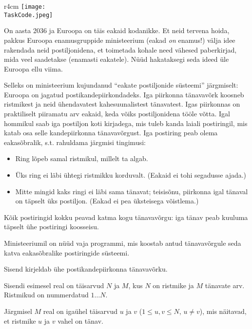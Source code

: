 ﻿\documentclass{boi2014-et}
\renewcommand{\TaskCode}{postmen}
\begin{document}
    \begin{wrapfigure}[8]{r}{4cm}
        \vspace{-18pt}
        \texttt{[image: \\TaskCode.jpeg]}
    \end{wrapfigure}

    On aasta 2036 ja Euroopa on täis eakaid kodanikke.
    Et neid tervena hoida, pakkus Euroopa enamusgruppide ministeerium
    (eakad \emph{on} enamus!) välja idee rakendada neid postiljonidena,
    et toimetada kohale need vähesed paberkirjad, mida veel saadetakse
    (enamasti eakatele).
    Nüüd hakataksegi seda ideed üle Euroopa ellu viima.

    Selleks on ministeerium kujundanud ``eakate postiljonide süsteemi''
    järgmiselt:
    Euroopa on jagatud postikandepiirkondadeks. Iga piirkonna tänavavõrk
    koosneb ristmikest ja neid ühendavatest kahesuunalistest tänavatest.
    Igas piirkonnas on praktiliselt piiramatu arv eakaid, keda võiks
    postiljonidena tööle võtta. Igal hommikul saab iga postiljon koti
    kirjadega, mis tuleb kanda laiali postiringil, mis katab osa selle
    kandepiirkonna tänavavõrgust. Iga postiring peab olema eakasõbralik,
    s.t. rahuldama järgmisi tingimusi:
    \begin{itemize}
        \item Ring lõpeb samal ristmikul, millelt ta algab.
        \item Üks ring ei läbi ühtegi ristmikku korduvalt.
            (Eakaid ei tohi segadusse ajada.)
        \item Mitte mingid kaks ringi ei läbi sama tänavat;
            teisisõnu, piirkonna igal tänaval on täpselt üks postiljon.
            (Eakad ei pea üksteisega võistlema.)
    \end{itemize}

    Kõik postiringid kokku peavad katma kogu tänavavõrgu: iga tänav peab
    kuuluma täpselt ühe postiringi koosseisu.

    \Task

    Ministeeriumil on nüüd vaja programmi, mis koostab antud tänavavõrgule
    seda katva eaka\-sõbralike postiringide süsteemi.

    \Input

    Sisend kirjeldab ühe postikandepiirkonna tänavavõrku.

    Sisendi esimesel real on täisarvud $N$ ja $M$, kus $N$ on ristmike ja
    $M$ tänavate arv. Ristmikud on nummerdatud $1 \ldots N$.

    Järgmisel $M$ real on igaühel täisarvud $u$ ja $v$ ($1 \le u, v \le N$,
    $u \ne v$), mis näitavad, et ristmike $u$ ja $v$ vahel on tänav.
\end{document}

